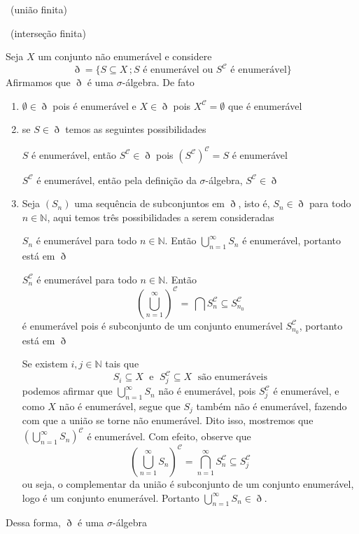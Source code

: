 \documentclass[a4paper, 11pt]{book}
\theoremstyle{definition}
\newcommand{\obs}{\noindent{\textbf{\textcolor{black}{\sffamily Observação:}}}~}
\newcommand{\bN}{\mathbb{N}}
\newcommand{\cC}{\mathcal{C}}
\begin{document}
\obs (união finita)

\obs (interseção finita)

\begin{ex}
    Seja $X$ um conjunto não enumerável e considere
    \[
        \eth = \{ S \subseteq X \,; \text{$S$ é enumerável ou $S^{\mathcal{C}}$ é enumerável} \}
    \]
    Afirmamos que $\eth$ é uma $\sigma$-álgebra. De fato
    \begin{enumerate}[leftmargin=*]
        \item $\emptyset \in \eth$ pois é enumerável e $X \in \eth$ pois $X^\cC = \emptyset$ que é enumerável

        \item se $S \in \eth$ temos as seguintes possibilidades

        $S$ é enumerável, então $S^\cC \in \eth$ pois $(S^\cC)^\cC = S$ é enumerável

        $S^\cC$ é enumerável, então pela definição da $\sigma$-álgebra, $S^\cC \in \eth$

        \item Seja $(S_n)$ uma sequência de subconjuntos em $\eth$, isto é, $S_n \in \eth$ para todo $n \in \bN$, aqui temos três possibilidades a serem consideradas
        
        $S_n$ é enumerável para todo $n \in \bN$. Então $\bigcup_{n=1}^\infty S_n$ é enumerável, portanto está em $\eth$

        $S_n^\cC$ é enumerável para todo $n \in \bN$. Então
        \[
            \left( \bigcup_{n=1}^\infty \right)^\cC \!\! = \, \bigcap S_n^\cC \subseteq S_{n_0}^\cC
        \]
        é enumerável pois é subconjunto de um conjunto enumerável $S_{n_0}^\cC$, portanto está em $\eth$

        Se existem $i,j \in \bN$ tais que
        \[
            S_i \subseteq X \;\text{ e }\; S_j^\cC \subseteq X \;\text{ são enumeráveis}
        \]
        podemos afirmar que $\bigcup_{n=1}^\infty S_n$ não é enumerável, pois $S_j^\cC$ é enumerável, e como $X$ não é enumerável, segue que $S_j$ também não é enumerável, fazendo com que a união se torne não enumerável. Dito isso, mostremos que $ \left( \bigcup_{n=1}^\infty S_n \right)^\cC$ é enumerável. Com efeito, observe que
        \[
            \left( \bigcup_{n=1}^\infty S_n \right)^\cC = \bigcap_{n=1}^\infty S_n^\cC \subseteq S_j^\cC
        \]
        ou seja, o complementar da união é subconjunto de um conjunto enumerável, logo é um conjunto enumerável. Portanto $\bigcup_{n=1}^\infty S_n \in \eth$.
    \end{enumerate}
    Dessa forma, $\eth$ é uma $\sigma$-álgebra
\end{ex}
\end{document}

